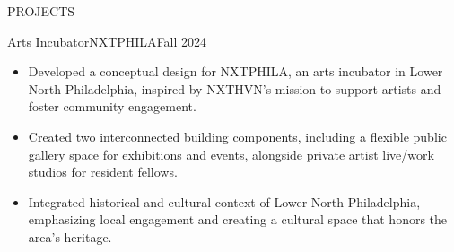 \documentclass[]{mcdowellcv}
\begin{document}
	\begin{cvsection}{PROJECTS}

		\begin{cvsubsection}{Arts Incubator}{NXTPHILA}{Fall 2024}
			\begin{itemize}
				\item Developed a conceptual design for NXTPHILA, an arts incubator in Lower North Philadelphia, inspired by NXTHVN's mission to support artists and foster community engagement.
				\item Created two interconnected building components, including a flexible public gallery space for exhibitions and events, alongside private artist live/work studios for resident fellows.
				\item Integrated historical and cultural context of Lower North Philadelphia, emphasizing local engagement and creating a cultural space that honors the area's heritage.
			\end{itemize}
		\end{cvsubsection}

	\end{cvsection}
\end{document}

